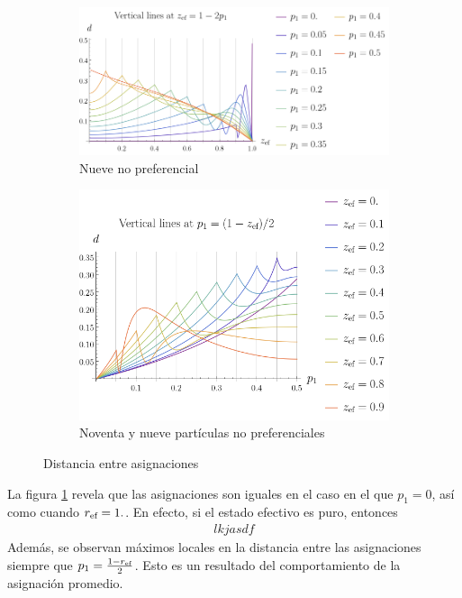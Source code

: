 \begin{figure}[ht!]
    \centering
    \begin{subfigure}{0.5\textwidth}
      \centering
      \includegraphics[width=0.9\linewidth]{appendices/figures/dist_avg_max_vs_z.png}
      \caption{Nueve no preferencial}
    \end{subfigure}%
    \begin{subfigure}{0.5\textwidth}
      \centering
      \includegraphics[width=0.9\linewidth]{appendices/figures/dist_avg_max_vs_p.png}
      \caption{Noventa y nueve partículas no preferenciales}
    \end{subfigure}
    \caption{Distancia entre asignaciones }\label{ap:DistAvgMaxEnt}
\end{figure}
La figura \ref{ap:DistAvgMaxEnt} revela que las asignaciones son iguales en el caso en el que $p_{1}=0$, así como cuando $r_{\text{ef}}=1.$. En efecto, si el estado efectivo es puro, entonces 
\begin{align}
    lkjasdf
\end{align}
Además, se observan máximos locales en la distancia entre las asignaciones siempre que $p_{1}=\frac{1-r_{\text{ef}}}{2}$. Esto es un resultado del comportamiento de la asignación promedio.

